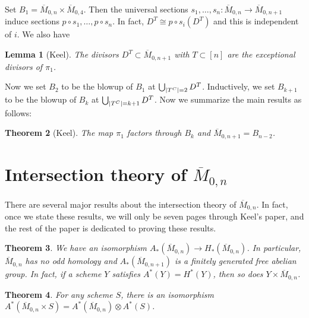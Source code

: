 \documentclass{amsart}
\newtheorem{thm}{Theorem}[section]
\newtheorem{lem}[thm]{Lemma}
\theoremstyle{definition}
\theoremstyle{remark}
\theoremstyle{plain}
\theoremstyle{definition}
\theoremstyle{remark}
\newcommand{\ol}[1]{\overline{#1}}
\begin{document}
Set $B_1 = \ol{M}_{0,n} \times \ol{M}_{0,4}$. Then the universal sections $s_1, \ldots, s_n \colon \ol{M}_{0,n} \to \ol{M}_{0,n+1}$ induce sections $p \circ s_1, \ldots, p \circ s_n$. In fact, $D^T \cong p \circ s_i(D^T)$ and this is independent of $i$. We also have

\begin{lem}[Keel]
    The divisors $D^T \subset \ol{M}_{0,n+1}$ with $T \subset [n]$ are the exceptional divisors of $\pi_1$.
\end{lem}

Now we set $B_2$ to be the blowup of $B_1$ at $\bigcup_{\abs{T^C}=2} D^T$. Inductively, we set $B_{k+1}$ to be the blowup of $B_k$ at $\bigcup_{\abs{T^C}=k+1} D^T$. Now we summarize the main results as follows:

\begin{thm}[Keel]
    The map $\pi_1$ factors through $B_k$ and $\ol{M}_{0,n+1} = B_{n-2}$.
\end{thm}

\section{Intersection theory of $\ol{M}_{0,n}$}%
\label{sec:intersection_theory_of_m__0_n_}

There are several major results about the intersection theory of $\ol{M}_{0,n}$. In fact, once we state these results, we will only be seven pages through Keel's paper, and the rest of the paper is dedicated to proving these results.

\begin{thm}
    We have an isomorphism $A_*(\ol{M}_{0,n}) \to H_*(\ol{M}_{0,n})$. In particular, $\ol{M}_{0,n}$ has no odd homology and $A_*(\ol{M}_{0,n+1})$ is a finitely generated free abelian group. In fact, if a scheme $Y$ satisfies $A^*(Y) = H^*(Y)$, then so does $Y \times \ol{M}_{0,n}$.
\end{thm}

\begin{thm}
    For any scheme $S$, there is an isomorphism $A^*(\ol{M}_{0,n} \times S) = A^*(\ol{M}_{0,n}) \otimes A^*(S)$.
\end{thm}
\end{document}
